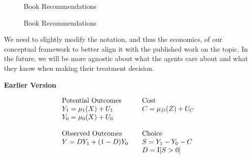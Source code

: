 \begin{frame}
\begin{figure}
\caption{Book Recommendations}
\hspace{0.5cm}
\end{figure}
\end{frame}


\begin{frame}
\begin{figure}
\caption{Book Recommendations}
\end{figure}
\end{frame}

\begin{frame}
We need to slightly modify the notation, and thus the economics, of our conceptual framework to better align it with the published work on the topic. In the future, we will be more agnostic about what the agents care about and what they know when making their treatment decision.
\end{frame}

\begin{frame}
\textbf{Earlier Version}

\begin{align*}\begin{array}{l@{\qquad}l}
\text{Potential Outcomes} & \text{Cost} \\
Y_1 = \mu_1(X) + U_1      &C = \mu_D(Z) + U_C \\
Y_0 = \mu_0(X) + U_0      & \\
    & \\
\text{Observed Outcomes } & \text{Choice} \\
Y = D Y_1 + (1 - D)Y_0 & S = Y_1 - Y_0 - C \\
                       & D = \mathrm{I}[S > 0] \\
\end{array}\end{align*}
\end{frame}


